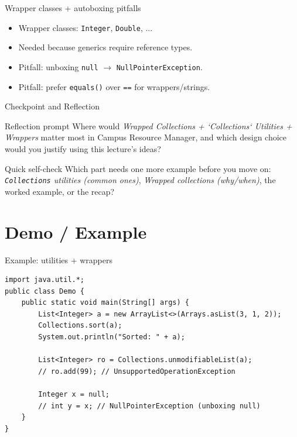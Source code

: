 \documentclass{beamer}
\begin{document}
\begin{frame}{Wrapper classes + autoboxing pitfalls}
  \begin{itemize}[<+->]
    \item Wrapper classes: \texttt{Integer}, \texttt{Double}, ...
    \item Needed because generics require reference types.
    \item Pitfall: unboxing \texttt{null} $\rightarrow$ \texttt{NullPointerException}.
    \item Pitfall: prefer \texttt{equals()} over \texttt{==} for wrappers/strings.
  \end{itemize}
  \slidesources{\OOPSUnitVSources}
\end{frame}

\begin{frame}{Checkpoint and Reflection}
\begin{block}{Reflection prompt}
Where would \textit{Wrapped Collections + `Collections` Utilities + Wrappers} matter most in Campus Resource Manager, and which design choice would you justify using this lecture's ideas?
\end{block}
\begin{block}{Quick self-check}
Which part needs one more example before you move on: \textit{\texttt{Collections} utilities (common ones)}, \textit{Wrapped collections (why/when)}, the worked example, or the recap?
\end{block}
  \slidesources{\OOPSUnitVSources}
\end{frame}

\section{Demo / Example}
\label{sec:demo}

\begin{frame}[fragile,shrink=8]{Example: utilities + wrappers}
\begin{lstlisting}
import java.util.*;
public class Demo {
    public static void main(String[] args) {
        List<Integer> a = new ArrayList<>(Arrays.asList(3, 1, 2));
        Collections.sort(a);
        System.out.println("Sorted: " + a);

        List<Integer> ro = Collections.unmodifiableList(a);
        // ro.add(99); // UnsupportedOperationException

        Integer x = null;
        // int y = x; // NullPointerException (unboxing null)
    }
}
\end{lstlisting}
  \slidesources{\OOPSUnitVSources}
\end{frame}
\end{document}
